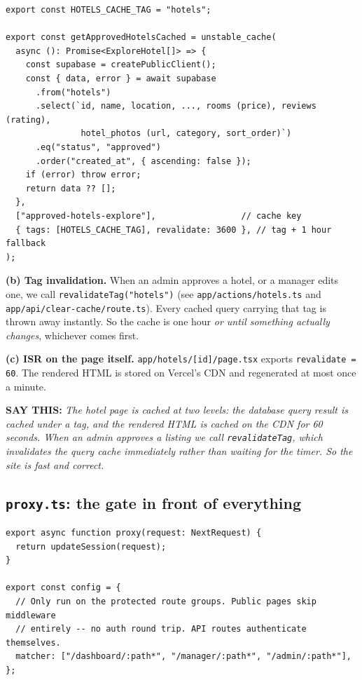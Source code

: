 \documentclass[11pt,a4paper]{article}
\newcommand{\saythis}[1]{\begin{saybox}\textbf{\small\color{primary}SAY THIS:} \textit{#1}\end{saybox}}
\newcommand{\file}[1]{\texttt{\small #1}}
\begin{document}
\begin{lstlisting}[language=TS,caption={lib/hotels.ts}]
export const HOTELS_CACHE_TAG = "hotels";

export const getApprovedHotelsCached = unstable_cache(
  async (): Promise<ExploreHotel[]> => {
    const supabase = createPublicClient();
    const { data, error } = await supabase
      .from("hotels")
      .select(`id, name, location, ..., rooms (price), reviews (rating),
               hotel_photos (url, category, sort_order)`)
      .eq("status", "approved")
      .order("created_at", { ascending: false });
    if (error) throw error;
    return data ?? [];
  },
  ["approved-hotels-explore"],                 // cache key
  { tags: [HOTELS_CACHE_TAG], revalidate: 3600 }, // tag + 1 hour fallback
);
\end{lstlisting}

\textbf{(b) Tag invalidation.} When an admin approves a hotel, or a manager
edits one, we call \texttt{revalidateTag("hotels")} (see
\file{app/actions/hotels.ts} and \file{app/api/clear-cache/route.ts}). Every
cached query carrying that tag is thrown away instantly. So the cache is one
hour \emph{or until something actually changes}, whichever comes first.

\textbf{(c) ISR on the page itself.} \file{app/hotels/[id]/page.tsx} exports
\texttt{revalidate = 60}. The rendered HTML is stored on Vercel's CDN and
regenerated at most once a minute.

\saythis{The hotel page is cached at two levels: the database query result is
cached under a tag, and the rendered HTML is cached on the CDN for 60 seconds.
When an admin approves a listing we call \texttt{revalidateTag}, which
invalidates the query cache immediately rather than waiting for the timer. So
the site is fast \emph{and} correct.}

\subsection{\file{proxy.ts}: the gate in front of everything}

\begin{lstlisting}[language=TS,caption={proxy.ts}]
export async function proxy(request: NextRequest) {
  return updateSession(request);
}

export const config = {
  // Only run on the protected route groups. Public pages skip middleware
  // entirely -- no auth round trip. API routes authenticate themselves.
  matcher: ["/dashboard/:path*", "/manager/:path*", "/admin/:path*"],
};
\end{lstlisting}
\end{document}
